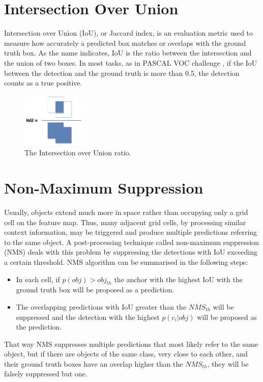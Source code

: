 \section{Intersection Over Union}
Intersection over Union (IoU), or Jaccard index, is an evaluation metric used to measure how accurately a predicted box matches or overlaps with the ground truth box. As the name indicates, IoU is the ratio between the intersection and the union of two boxes. In most tasks, as in PASCAL VOC challenge \cite{everingham2010pascal}, if the IoU between the detection and the ground truth is more than 0.5, the detection counts as a true positive.

\begin{figure}[!htb]
  \centering
  \includegraphics[width=3cm]{figures/ch2/fig8.png}
  \caption{The Intersection over Union ratio.}
  \label{fig8}
\end{figure} 

\section{Non-Maximum Suppression}
Usually, objects extend much more in space rather than occupying only a grid cell on the feature map. Thus, many adjacent grid cells, by processing similar context information, may be triggered and produce multiple predictions referring to the same object. A post-processing technique called non-maximum suppression (NMS) deals with this problem by suppressing the detections with IoU exceeding a certain threshold. NMS algorithm can be summarised in the following steps:

\begin{itemize}
  \item In each cell, if $p(obj)>obj_{th}$ the anchor with the highest IoU with the ground truth box will be proposed as a prediction. 
  \item The overlapping predictions with IoU greater than the $NMS_{th}$ will be suppressed and the detection with the highest $p(c_i|obj)$ will be proposed as the prediction. 
\end{itemize}

That way NMS suppresses multiple predictions that most likely refer to the same object, but if there are objects of the same class, very close to each other, and their ground truth boxes have an overlap higher than the $NMS_{th}$, they will be falsely suppressed but one. 

